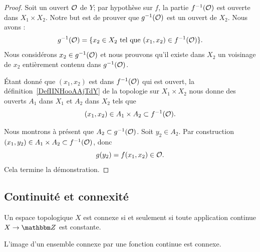 \begin{proof}
    Soit un ouvert \( \mathcal{O}\) de \( Y\); par hypothèse sur \( f\), la partie \( f^{-1}(\mathcal{O})\) est ouverte dans \( X_1\times X_2\). Notre but est de prouver que \( g^{-1}(\mathcal{O})\) est un ouvert de \( X_2\). Nous avons :
    \begin{equation}
        g^{-1}(\mathcal{O})=\{ x_2\in X_2\text{ tel que } (x_1,x_2)\in f^{-1}(\mathcal{O}) \}.
    \end{equation}
    Nous considérons \( x_2\in g^{-1}(\mathcal{O})\) et nous prouvons qu'il existe dans \( X_2\) un voisinage de \( x_2\) entièrement contenu dans \( g^{-1}(\mathcal{O})\).

    Étant donné que \( (x_1,x_2)\) est dans \( f^{-1}(\mathcal{O})\) qui est ouvert, la définition~\ref{DefIINHooAAjTdY} de la topologie sur \( X_1\times X_2\) nous donne des ouverts \( A_1\) dans \( X_1\) et \( A_2\) dans \( X_2\) tels que
    \begin{equation}
        (x_1,x_2)\in A_1\times A_2\subset f^{-1}(\mathcal{O}).
    \end{equation}

    Nous montrons à présent que \( A_2\subset g^{-1}(\mathcal{O})\). Soit \( y_2\in A_2\). Par construction \( (x_1,y_2)\in A_1\times A_2\subset f^{-1}(\mathcal{O})\), donc
    \begin{equation}
        g(y_2)=f(x_1,x_2)\in \mathcal{O}.
    \end{equation}
    Cela termine la démonstration.
\end{proof}

\subsection{Continuité et connexité}


\begin{proposition} \label{PropConnexiteViaFonction}
  Un espace topologique \( X \) est connexe si et seulement si toute application continue \( X\to \eZ\) est constante.
\end{proposition}

\begin{proposition}\label{PropGWMVzqb}
    L'image d'un ensemble connexe par une fonction continue est connexe.
\end{proposition}

